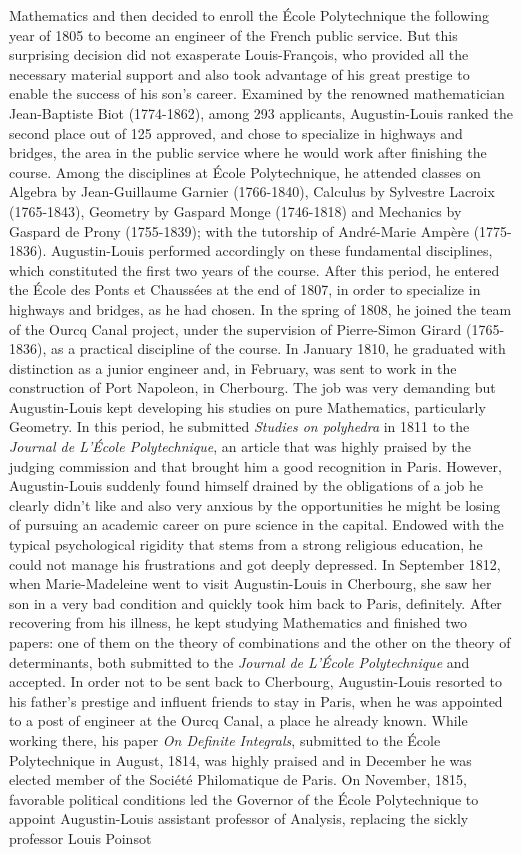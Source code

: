 Mathematics and then decided to enroll the \'Ecole Polytechnique the following year of 1805 to become an engineer of the French public service. But this surprising decision did not exasperate Louis-Fran\c{c}ois, who provided all the necessary material support and also took advantage of his great prestige to enable the success of his son's career. Examined by the renowned mathematician Jean-Baptiste Biot (1774-1862), among 293 applicants, Augustin-Louis ranked the second place out of 125 approved, and chose to specialize in highways and bridges, the area in the public service where he would work after finishing the course. Among the disciplines at \'Ecole Polytechnique, he attended classes on Algebra by Jean-Guillaume Garnier (1766-1840), Calculus by Sylvestre Lacroix (1765-1843), Geometry by Gaspard Monge (1746-1818) and Mechanics by Gaspard de Prony (1755-1839); with the tutorship of Andr\'e-Marie Amp\`ere (1775-1836). Augustin-Louis performed accordingly on these fundamental disciplines, which constituted the first two years of the course. After this period, he entered the \'Ecole des Ponts et Chauss\'ees at the end of 1807, in order to specialize in highways and bridges, as he had chosen. In the spring of 1808, he joined the team of the Ourcq Canal project, under the supervision of Pierre-Simon Girard (1765-1836), as a practical discipline of the course. In January 1810, he graduated with distinction as a junior engineer and, in February, was sent to work in the construction of Port Napoleon, in Cherbourg. The job was very demanding but Augustin-Louis kept developing his studies on pure Mathematics, particularly Geometry. In this period, he submitted \emph{Studies on polyhedra} in 1811 to the \emph{Journal de L'\'Ecole Polytechnique}, an article that was highly praised by the judging commission and that brought him a good recognition in Paris. However, Augustin-Louis suddenly found himself drained by the obligations of a job he clearly didn't like and also very anxious by the opportunities he might be losing of pursuing an academic career on pure science in the capital. Endowed with the typical psychological rigidity that stems from a strong religious education, he could not manage his frustrations and got deeply depressed. In September 1812, when Marie-Madeleine went to visit Augustin-Louis in Cherbourg, she saw her son in a very bad condition and quickly took him back to Paris, definitely. After recovering from his illness, he kept studying Mathematics and finished two papers: one of them on the theory of combinations and the other on the theory of determinants, both submitted to the \emph{Journal de L'\'Ecole Polytechnique} and accepted. In order not to be sent back to Cherbourg, Augustin-Louis resorted to his father's prestige and influent friends to stay in Paris, when he was appointed to a post of engineer at the Ourcq Canal, a place he already known. While working there, his paper \emph{On Definite Integrals}, submitted to the  \'Ecole Polytechnique in August, 1814, was highly praised and in December he was elected member of the Soci\'et\'e Philomatique de Paris. On November, 1815, favorable political conditions led the Governor of the \'Ecole Polytechnique to appoint Augustin-Louis assistant professor of Analysis, replacing the sickly professor Louis Poinsot 